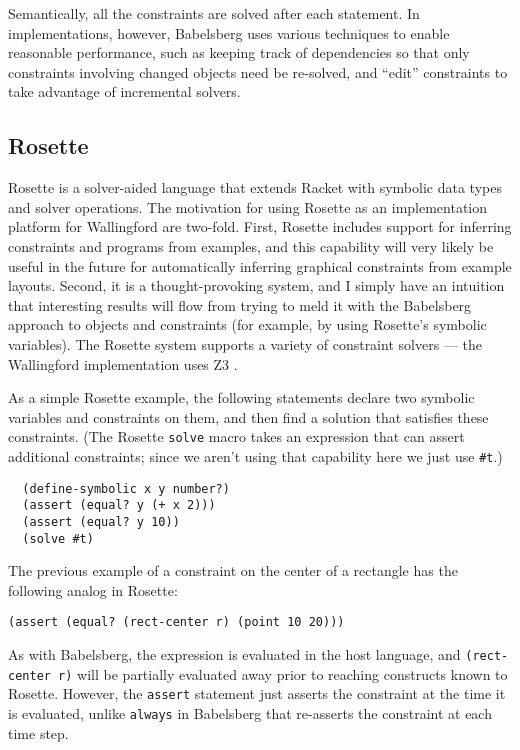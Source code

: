 \documentclass{sigplanconf}
\begin{document}
Semantically, all the constraints are solved after each statement.  In
implementations, however, Babelsberg uses various techniques to enable
reasonable performance, such as keeping track of dependencies so that only
constraints involving changed objects need be re-solved, and ``edit''
constraints to take advantage of incremental solvers.

\subsection{Rosette}
\label{sec:rosette}

Rosette is a solver-aided 
language that extends Racket \cite{racket} with
symbolic data types and solver operations.  The motivation for using
Rosette as an implementation platform for Wallingford are two-fold.  First,
Rosette includes support for inferring constraints and programs from
examples, and this capability will very likely be useful in the future for
automatically inferring graphical constraints from example layouts.
Second, it is a thought-provoking system, and I simply have
an intuition that interesting results will flow from trying to meld it with
the Babelsberg approach to objects and constraints (for example, by
using Rosette's symbolic variables).
The Rosette system supports a variety of constraint solvers --- the
Wallingford implementation uses Z3 \cite{demoura-z3-2008}.

As a simple Rosette example, the following statements declare two
symbolic variables and constraints on them, and then find a solution
that satisfies these constraints.  (The Rosette \verb|solve| macro
takes an expression that can assert additional constraints; since we
aren't using that capability here we just use \verb|#t|.)

\begin{verbatim}
  (define-symbolic x y number?)
  (assert (equal? y (+ x 2)))
  (assert (equal? y 10))
  (solve #t)
\end{verbatim}

The previous example of a constraint on the center of a rectangle has
the following analog in Rosette:

\begin{verbatim}
(assert (equal? (rect-center r) (point 10 20)))
\end{verbatim}

As with Babelsberg, the expression is evaluated in the host language, and
\verb|(rect-center r)| will be partially evaluated away prior to reaching
constructs known to Rosette.  
However, the \verb|assert| statement just asserts the constraint at the
time it is evaluated, unlike \verb|always| in Babelsberg that re-asserts
the constraint at each time step.
\end{document}

